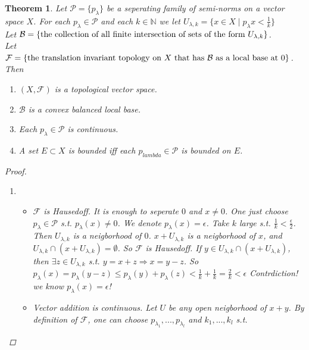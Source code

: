 \documentclass{article}
\newtheorem*{theorem}{Theorem}
\begin{document}
\begin{theorem}
    Let $\mathcal{P} = \{p_{\lambda}\}$ be a seperating family of semi-norms on a vector space $X$. 
    For each $p_{\lambda} \in \mathcal{P}$ and each $k \in \mathbb{N}$ we let $U_{\lambda, k} = \{x \in X \mid p_{\lambda}{x} < \frac{1}{k}\}$ \\
    Let $\mathcal{B} = \{ \textnormal{the collection of all finite intersection of sets of the form } U_{\lambda, k}\}$. \\
    Let $\mathcal{F} = \{\textnormal{the translation invariant topology on $X$ that has $\mathcal{B}$ as a local base at $0$}\}$.
    Then
    \begin{enumerate}
        \item $(X, \mathcal{F})$ is a topological vector space.
        \item $\mathcal{B}$ is a convex balanced local base.
        \item Each $p_{\lambda} \in \mathcal{P}$ is continuous.
        \item A set $E \subset X$ is bounded iff each $p_{lambda} \in \mathcal{P}$ is bounded on $E$.
    \end{enumerate}
    \begin{proof} \hfill
        \begin{enumerate}
            \item 
            \begin{itemize}
                \item $\mathcal{F}$ is Hausedoff. It is enough to seperate $0$ and $x \ne 0$.
                One just choose $p_{\lambda} \in \mathcal{P}$ s.t. $p_{\lambda}(x) \ne 0$.
                We denote $p_{\lambda}(x) = \epsilon$. Take $k$ large s.t. $\frac{1}{k} < \frac{\epsilon}{2}$.
                Then $U_{\lambda, k}$ is a neigborhood of $0$.
                $x + U_{\lambda, k}$ is a neigborhood of $x$, and $U_{\lambda, k} \cap (x + U_{\lambda, k}) = \emptyset$.
                So $\mathcal{F}$ is Hausedoff.
                If $y \in U_{\lambda, k} \cap (x + U_{\lambda, k})$, then $\exists z \in U_{\lambda, k}$ s.t. $y = x + z \Rightarrow x = y - z$.
                So $p_{\lambda}(x) = p_{\lambda}(y - z) \le p_{\lambda}(y) + p_{\lambda}(z) < \frac{1}{k} + \frac{1}{k} = \frac{2}{k} < \epsilon$
                Contrdiction! we know $p_{\lambda}(x) = \epsilon$!
                \item Vector addition is continuous. Let $U$ be any open neigborhood of $x+y$. By definition of $\mathcal{F}$, 
                one can choose $p_{\lambda_1}, ..., p_{\lambda_l}$ and $k_1, ..., k_l$ s.t.

\end{itemize}
\end{enumerate}
\end{proof}
\end{theorem}
\end{document}
